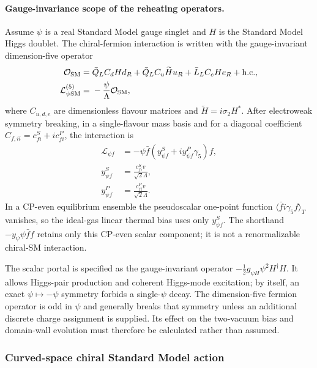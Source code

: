 \documentclass[epj]{svjour}
\begin{document}
\paragraph{Gauge-invariance scope of the reheating operators.}
Assume $\psi$ is a real Standard Model gauge singlet and $H$
is the Standard Model Higgs doublet. The chiral-fermion interaction
is written with the gauge-invariant dimension-five operator
\begin{align}
\mathcal{O}_{\rm SM}={}&
\bar Q_L C_d H d_R
+\bar Q_L C_u\widetilde H u_R
+\bar L_L C_e H e_R+\mathrm{h.c.},
\\
\mathcal{L}_{\psi{\rm SM}}^{(5)}
={}&-\frac{\psi}{\Lambda}\mathcal{O}_{\rm SM},
\end{align}
where $C_{u,d,e}$ are dimensionless flavour matrices and
$\widetilde H=i\sigma_2H^*$. After electroweak symmetry breaking,
in a single-flavour mass basis and for a diagonal coefficient
$C_{f,ii}=c^S_{fi}+i c^P_{fi}$, the interaction is
\begin{equation}
\begin{aligned}
\mathcal{L}_{\psi f}
&=-\psi\bar f\left(y^S_{\psi f}
+i y^P_{\psi f}\gamma_5\right)f,\\
y^S_{\psi f}&=\frac{c^S_{fi}v}{\sqrt{2}\Lambda},\\
y^P_{\psi f}&=\frac{c^P_{fi}v}{\sqrt{2}\Lambda}.
\end{aligned}
\label{eq:ptum_broken_phase_scalar_pseudoscalar}
\end{equation}
In a CP-even equilibrium ensemble the pseudoscalar one-point function
$\langle\bar f i\gamma_5 f\rangle_T$ vanishes, so the ideal-gas
linear thermal bias uses only $y^S_{\psi f}$. The shorthand
$-y_\psi\psi\bar f f$ retains only this CP-even scalar component;
it is not a renormalizable chiral-SM interaction.

The scalar portal is specified as the gauge-invariant operator
$-\tfrac12g_{\psi H}\psi^2H^\dagger H$. It allows Higgs-pair
production and coherent Higgs-mode excitation; by itself, an exact
$\psi\mapsto-\psi$ symmetry forbids a single-$\psi$ decay. The
dimension-five fermion operator is odd in $\psi$ and generally
breaks that symmetry unless an additional discrete charge
assignment is supplied. Its effect on the two-vacuum bias and
domain-wall evolution must therefore be calculated rather than
assumed.

\subsubsection{Curved-space chiral Standard Model action}
\label{sec:sm_covariant_action}
\end{document}
